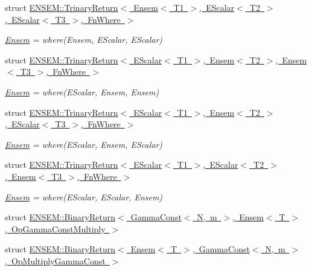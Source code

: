 \begin{DoxyCompactItemize}
struct \mbox{\hyperlink{structENSEM_1_1TrinaryReturn_3_01Ensem_3_01T1_01_4_00_01EScalar_3_01T2_01_4_00_01EScalar_3_01T3_01_4_00_01FnWhere_01_4}{E\+N\+S\+E\+M\+::\+Trinary\+Return$<$ Ensem$<$ T1 $>$, E\+Scalar$<$ T2 $>$, E\+Scalar$<$ T3 $>$, Fn\+Where $>$}}
\begin{DoxyCompactList}\small\item\em \mbox{\hyperlink{classENSEM_1_1Ensem}{Ensem}} = where(\+Ensem, E\+Scalar, E\+Scalar) \end{DoxyCompactList}\item 
struct \mbox{\hyperlink{structENSEM_1_1TrinaryReturn_3_01EScalar_3_01T1_01_4_00_01Ensem_3_01T2_01_4_00_01Ensem_3_01T3_01_4_00_01FnWhere_01_4}{E\+N\+S\+E\+M\+::\+Trinary\+Return$<$ E\+Scalar$<$ T1 $>$, Ensem$<$ T2 $>$, Ensem$<$ T3 $>$, Fn\+Where $>$}}
\begin{DoxyCompactList}\small\item\em \mbox{\hyperlink{classENSEM_1_1Ensem}{Ensem}} = where(\+E\+Scalar, Ensem, Ensem) \end{DoxyCompactList}\item 
struct \mbox{\hyperlink{structENSEM_1_1TrinaryReturn_3_01EScalar_3_01T1_01_4_00_01Ensem_3_01T2_01_4_00_01EScalar_3_01T3_01_4_00_01FnWhere_01_4}{E\+N\+S\+E\+M\+::\+Trinary\+Return$<$ E\+Scalar$<$ T1 $>$, Ensem$<$ T2 $>$, E\+Scalar$<$ T3 $>$, Fn\+Where $>$}}
\begin{DoxyCompactList}\small\item\em \mbox{\hyperlink{classENSEM_1_1Ensem}{Ensem}} = where(\+E\+Scalar, Ensem, E\+Scalar) \end{DoxyCompactList}\item 
struct \mbox{\hyperlink{structENSEM_1_1TrinaryReturn_3_01EScalar_3_01T1_01_4_00_01EScalar_3_01T2_01_4_00_01Ensem_3_01T3_01_4_00_01FnWhere_01_4}{E\+N\+S\+E\+M\+::\+Trinary\+Return$<$ E\+Scalar$<$ T1 $>$, E\+Scalar$<$ T2 $>$, Ensem$<$ T3 $>$, Fn\+Where $>$}}
\begin{DoxyCompactList}\small\item\em \mbox{\hyperlink{classENSEM_1_1Ensem}{Ensem}} = where(\+E\+Scalar, E\+Scalar, Ensem) \end{DoxyCompactList}\item 
struct \mbox{\hyperlink{structENSEM_1_1BinaryReturn_3_01GammaConst_3_01N_00_01m_01_4_00_01Ensem_3_01T_01_4_00_01OpGammaConstMultiply_01_4}{E\+N\+S\+E\+M\+::\+Binary\+Return$<$ Gamma\+Const$<$ N, m $>$, Ensem$<$ T $>$, Op\+Gamma\+Const\+Multiply $>$}}
\item 
struct \mbox{\hyperlink{structENSEM_1_1BinaryReturn_3_01Ensem_3_01T_01_4_00_01GammaConst_3_01N_00_01m_01_4_00_01OpMultiplyGammaConst_01_4}{E\+N\+S\+E\+M\+::\+Binary\+Return$<$ Ensem$<$ T $>$, Gamma\+Const$<$ N, m $>$, Op\+Multiply\+Gamma\+Const $>$}}

\end{DoxyCompactItemize}
